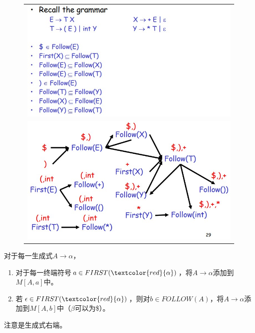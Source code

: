\begin{figure}[H]
\centering
\begin{tabular}{c}
\includegraphics[width=0.8\linewidth]{fig/follow_eg1.jpg}\\
\includegraphics[width=0.8\linewidth]{fig/follow_eg2.jpg}
\end{tabular}
\end{figure}

\begin{myalgorithm}[构造预测语法表]
对于每一生成式$A\to\alpha$，
\begin{enumerate}
	\item 对于每一终端符号$a\in FIRST(\textcolor{red}{\alpha})$，将$A\to\alpha$添加到$M[A,a]$中。
	\item 若$\epsilon\in FIRST(\textcolor{red}{\alpha})$，则对$b\in FOLLOW(A)$，将$A\to\alpha$添加到$M[A,b]$中（$\beta$可以为\$）。
\end{enumerate}
注意是生成式右端。
\end{myalgorithm}

